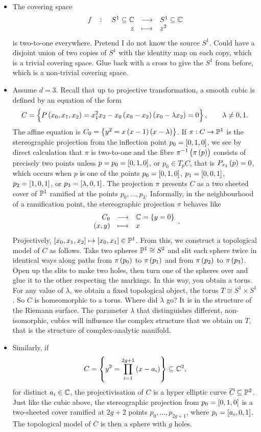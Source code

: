 \begin{example*}
\hfill
\begin{itemize}
\item The covering space
$$ \function[f]{S^1 \subseteq \C}{S^1 \subseteq \C}{z}{z^2} $$
is two-to-one everywhere. Pretend I do not know the source $ S^1 $. Could have a disjoint union of two copies of $ S^1 $ with the identity map on each copy, which is a trivial covering space. Glue back with a cross to give the $ S^1 $ from before, which is a non-trivial covering space.
\item Assume $ d = 3 $. Recall that up to projective transformation, a smooth cubic is defined by an equation of the form
$$ C = \cbr{P\br{x_0, x_1, x_2} = x_1^2x_2 - x_0\br{x_0 - x_2}\br{x_0 - \lambda x_2} = 0}, \qquad \lambda \ne 0, 1. $$
The affine equation is $ C_0 = \cbr{y^2 = x\br{x - 1}\br{x - \lambda}} $. If $ \pi : C \to \P^1 $ is the stereographic projection from the inflection point $ p_0 = \sbr{0, 1, 0} $, we see by direct calculation that $ \pi $ is two-to-one and the fibre $ \pi^{-1}\br{\pi\br{p}} $ consists of precisely two points unless $ p = p_0 = \sbr{0, 1, 0} $, or $ p_0 \in T_pC $, that is $ P_{x_1}\br{p} = 0 $, which occurs when $ p $ is one of the points $ p_0 = \sbr{0, 1, 0} $, $ p_1 = \sbr{0, 0, 1} $, $ p_2 = \sbr{1, 0, 1} $, or $ p_3 = \sbr{\lambda, 0, 1} $. The projection $ \pi $ presents $ C $ as a two sheeted cover of $ \P^1 $ ramified at the points $ p_0, \dots, p_3 $. Informally, in the neighbourhood of a ramification point, the stereographic projection $ \pi $ behaves like
$$ \function{C_0}{\C = \cbr{y = 0}}{\br{x, y}}{x}. $$
Projectively, $ \sbr{x_0, x_1, x_2} \mapsto \sbr{x_0, x_1} \in \P^1 $. From this, we construct a topological model of $ C $ as follows. Take two spheres $ \P^1 \cong S^2 $ and slit each sphere twice in identical ways along paths from $ \pi\br{p_0} $ to $ \pi\br{p_1} $ and from $ \pi\br{p_2} $ to $ \pi\br{p_3} $. Open up the slits to make two holes, then turn one of the spheres over and glue it to the other respecting the markings. In this way, you obtain a torus. For any value of $ \lambda $, we obtain a fixed topological object, the torus $ T \cong S^1 \times S^1 $. So $ C $ is homeomorphic to a torus. Where did $ \lambda $ go? It is in the structure of the Riemann surface. The parameter $ \lambda $ that distinguishes different, non-isomorphic, cubics will influence the complex structure that we obtain on $ T $, that is the structure of complex-analytic manifold.

\pagebreak

\item Similarly, if
$$ C = \cbr{y^2 = \prod_{i = 1}^{2g + 1} \br{x - a_i}} \subseteq \C^2, $$
for distinct $ a_i \in \C $, the projectivisation of $ C $ is a hyper elliptic curve $ \overline{C} \subseteq \P^2 $. Just like the cubic above, the stereographic projection from $ p_0 = \sbr{0, 1, 0} $ is a two-sheeted cover ramified at $ 2g + 2 $ points $ p_0, \dots, p_{2g + 1} $, where $ p_i = \sbr{a_i, 0, 1} $. The topological model of $ \overline{C} $ is then a sphere with $ g $ holes.
\end{itemize}
\end{example*}

